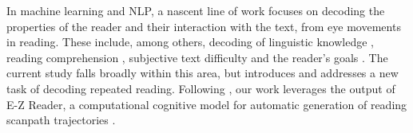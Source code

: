 In machine learning and NLP, a nascent line of work focuses on decoding the properties of the reader and their interaction with the text, from eye movements in reading. These include, among others, decoding of linguistic knowledge \citep{berzak_predicting_2017,berzak_assessing_2018,skerath2023native}, reading comprehension \cite{ahn_towards_2020,reich_inferring_2022,meziere2023using,Shubi2024Finegrained}, subjective text difficulty \cite{reich_inferring_2022} and the reader's goals \citep{hollenstein2023zuco,shubi2024decoding}. The current study falls broadly within this area, but introduces and addresses a new task of decoding repeated reading. %
Following \citet{sood2020improving}, our work leverages the output of \mbox{E-Z} Reader, a computational cognitive model for automatic generation of reading scanpath trajectories \cite{reichle1998toward,reichle2003ez,reichle2009using,veldre2023understanding}.